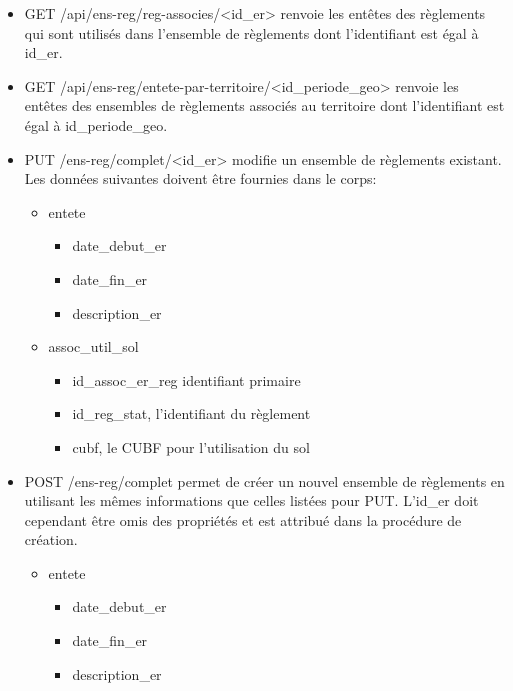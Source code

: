 \begin{itemize}
\begin{itemize}
\begin{itemize}
                \end{itemize}
        \end{itemize}
    \item GET /api/ens-reg/reg-associes/<id\_er> renvoie les entêtes des règlements qui sont utilisés dans l'ensemble de règlements dont l'identifiant est égal à id\_er.
    \item GET /api/ens-reg/entete-par-territoire/<id\_periode\_geo> renvoie les entêtes des ensembles de règlements associés au territoire dont l'identifiant est égal à id\_periode\_geo.
    \item PUT /ens-reg/complet/<id\_er> modifie un ensemble de règlements existant. Les données suivantes doivent être fournies dans le corps:
        \begin{itemize}
            \item entete
                \begin{itemize}
                    \item date\_debut\_er
                    \item date\_fin\_er
                    \item description\_er
                \end{itemize}
            \item assoc\_util\_sol
                \begin{itemize}
                    \item id\_assoc\_er\_reg identifiant primaire
                    \item id\_reg\_stat, l'identifiant du règlement
                    \item cubf, le \ac{CUBF} pour l'utilisation du sol
                \end{itemize}
        \end{itemize}
    \item POST /ens-reg/complet permet de créer un nouvel ensemble de règlements en utilisant les mêmes informations que celles listées pour PUT. L'id\_er doit cependant être omis des propriétés et est attribué dans la procédure de création.
        \begin{itemize}
            \item entete
                \begin{itemize}
                    \item date\_debut\_er
                    \item date\_fin\_er
                    \item description\_er
                \end{itemize}

\end{itemize}
\end{itemize}
